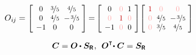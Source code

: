 \begin{tcolorbox}
\begin{equation*}
O_{i\hspace{-0.1ex}j} =
\scalebox{0.92}[0.92]{$\left[\hspace{-0.2ex}\begin{array}{c@{\hspace{.6em}}c@{\hspace{.6em}}c}
0 & \nicefrac{3}{5} & \nicefrac{4}{5} \\
0 & \nicefrac{4}{5} & - \hspace{.2ex} \nicefrac{3}{5} \\
-1 & 0 & 0
\end{array}\hspace{-0.4ex}\right]$}
\hspace{-0.25ex} = \hspace{-0.25ex}
\scalebox{0.92}[0.92]{$\left[\hspace{-0.2ex}\begin{array}{c@{\hspace{.6em}}c@{\hspace{.6em}}c}
0 & \mathcolor{red!33!white}{0} & 1 \\
\mathcolor{red!33!white}{0} & \mathcolor{red!77!black}{1} & \mathcolor{red!33!white}{0} \\
-1 & \mathcolor{red!33!white}{0} & 0
\end{array}\hspace{-0.2ex}\right]$}
\scalebox{0.92}[0.92]{$\left[\hspace{-0.2ex}\begin{array}{c@{\hspace{.6em}}c@{\hspace{.6em}}c}
\mathcolor{red!77!black}{1} & \mathcolor{red!33!white}{0} & \mathcolor{red!33!white}{0} \\
\mathcolor{red!33!white}{0} & \nicefrac{4}{5} & - \hspace{.2ex} \nicefrac{3}{5} \\
\mathcolor{red!33!white}{0} & \nicefrac{3}{5} & \nicefrac{4}{5}
\end{array}\hspace{-0.4ex}\right]$}
\end{equation*}

\begin{equation*}\begin{array}{c}
\bm{C} = \rotationtensor \hspace{-0.1ex} \dotp \bm{S_{\smash{\mathsf{R}}}}
\hspace{.1ex} , \:\:
\rotationtensor^{\T}\hspace{-0.5ex} \dotp \bm{C} = \bm{S_{\smash{\mathsf{R}}}}
\end{array}\end{equation*}


\end{tcolorbox}
